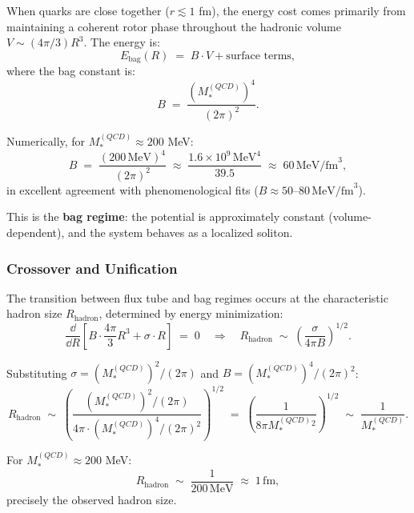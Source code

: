 \documentclass[11pt,a4paper]{article}
\theoremstyle{definition}
\theoremstyle{plain}
\theoremstyle{remark}
\begin{document}
When quarks are close together ($r \lesssim 1$ fm), the energy cost comes primarily from maintaining a coherent rotor phase throughout the hadronic volume $V \sim (4\pi/3)R^3$. The energy is:
\begin{equation}
E_{\mathrm{bag}}(R) \;=\; B \cdot V + \text{surface terms},
\end{equation}
where the bag constant is:
\begin{equation}
B \;=\; \frac{(M_*^{(QCD)})^4}{(2\pi)^2}.
\end{equation}

Numerically, for $M_*^{(QCD)} \approx 200$ MeV:
\begin{equation}
B \;=\; \frac{(200\,\text{MeV})^4}{(2\pi)^2} \;\approx\; \frac{1.6 \times 10^9\,\text{MeV}^4}{39.5} \;\approx\; 60\,\text{MeV/fm}^3,
\end{equation}
in excellent agreement with phenomenological fits ($B \approx 50$--$80\,\text{MeV/fm}^3$).

This is the \textbf{bag regime}: the potential is approximately constant (volume-dependent), and the system behaves as a localized soliton.

\subsubsection{Crossover and Unification}

The transition between flux tube and bag regimes occurs at the characteristic hadron size $R_{\mathrm{hadron}}$, determined by energy minimization:
\begin{equation}
\frac{\dd}{\dd R}\left[B \cdot \frac{4\pi}{3}R^3 + \sigma \cdot R\right] \;=\; 0 \quad\Rightarrow\quad R_{\mathrm{hadron}} \;\sim\; \left(\frac{\sigma}{4\pi B}\right)^{1/2}.
\end{equation}

Substituting $\sigma = (M_*^{(QCD)})^2 / (2\pi)$ and $B = (M_*^{(QCD)})^4 / (2\pi)^2$:
\begin{equation}
R_{\mathrm{hadron}} \;\sim\; \left(\frac{(M_*^{(QCD)})^2 / (2\pi)}{4\pi \cdot (M_*^{(QCD)})^4 / (2\pi)^2}\right)^{1/2} \;=\; \left(\frac{1}{8\pi M_*^{(QCD)} {}^2}\right)^{1/2} \;\sim\; \frac{1}{M_*^{(QCD)}}.
\end{equation}

For $M_*^{(QCD)} \approx 200$ MeV:
\begin{equation}
R_{\mathrm{hadron}} \;\sim\; \frac{1}{200\,\text{MeV}} \;\approx\; 1\,\text{fm},
\end{equation}
precisely the observed hadron size.
\end{document}
